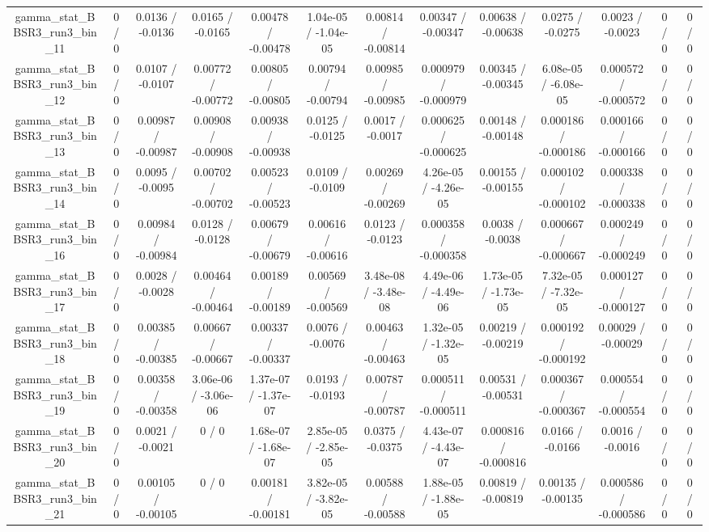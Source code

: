 \documentclass[10pt]{article}
\begin{document}
\begin{table}[htbp]
\begin{center}
\begin{tabular}{|c|c|c|c|c|c|c|c|c|c|c|c|c|}
  gamma_stat_BBSR3_run3_bin_11 & 0 / 0 & 0.0136 / -0.0136 & 0.0165 / -0.0165 & 0.00478 / -0.00478 & 1.04e-05 / -1.04e-05 & 0.00814 / -0.00814 & 0.00347 / -0.00347 & 0.00638 / -0.00638 & 0.0275 / -0.0275 & 0.0023 / -0.0023 & 0 / 0 & 0 / 0 \\ 
  gamma_stat_BBSR3_run3_bin_12 & 0 / 0 & 0.0107 / -0.0107 & 0.00772 / -0.00772 & 0.00805 / -0.00805 & 0.00794 / -0.00794 & 0.00985 / -0.00985 & 0.000979 / -0.000979 & 0.00345 / -0.00345 & 6.08e-05 / -6.08e-05 & 0.000572 / -0.000572 & 0 / 0 & 0 / 0 \\ 
  gamma_stat_BBSR3_run3_bin_13 & 0 / 0 & 0.00987 / -0.00987 & 0.00908 / -0.00908 & 0.00938 / -0.00938 & 0.0125 / -0.0125 & 0.0017 / -0.0017 & 0.000625 / -0.000625 & 0.00148 / -0.00148 & 0.000186 / -0.000186 & 0.000166 / -0.000166 & 0 / 0 & 0 / 0 \\ 
  gamma_stat_BBSR3_run3_bin_14 & 0 / 0 & 0.0095 / -0.0095 & 0.00702 / -0.00702 & 0.00523 / -0.00523 & 0.0109 / -0.0109 & 0.00269 / -0.00269 & 4.26e-05 / -4.26e-05 & 0.00155 / -0.00155 & 0.000102 / -0.000102 & 0.000338 / -0.000338 & 0 / 0 & 0 / 0 \\ 
  gamma_stat_BBSR3_run3_bin_16 & 0 / 0 & 0.00984 / -0.00984 & 0.0128 / -0.0128 & 0.00679 / -0.00679 & 0.00616 / -0.00616 & 0.0123 / -0.0123 & 0.000358 / -0.000358 & 0.0038 / -0.0038 & 0.000667 / -0.000667 & 0.000249 / -0.000249 & 0 / 0 & 0 / 0 \\ 
  gamma_stat_BBSR3_run3_bin_17 & 0 / 0 & 0.0028 / -0.0028 & 0.00464 / -0.00464 & 0.00189 / -0.00189 & 0.00569 / -0.00569 & 3.48e-08 / -3.48e-08 & 4.49e-06 / -4.49e-06 & 1.73e-05 / -1.73e-05 & 7.32e-05 / -7.32e-05 & 0.000127 / -0.000127 & 0 / 0 & 0 / 0 \\ 
  gamma_stat_BBSR3_run3_bin_18 & 0 / 0 & 0.00385 / -0.00385 & 0.00667 / -0.00667 & 0.00337 / -0.00337 & 0.0076 / -0.0076 & 0.00463 / -0.00463 & 1.32e-05 / -1.32e-05 & 0.00219 / -0.00219 & 0.000192 / -0.000192 & 0.00029 / -0.00029 & 0 / 0 & 0 / 0 \\ 
  gamma_stat_BBSR3_run3_bin_19 & 0 / 0 & 0.00358 / -0.00358 & 3.06e-06 / -3.06e-06 & 1.37e-07 / -1.37e-07 & 0.0193 / -0.0193 & 0.00787 / -0.00787 & 0.000511 / -0.000511 & 0.00531 / -0.00531 & 0.000367 / -0.000367 & 0.000554 / -0.000554 & 0 / 0 & 0 / 0 \\ 
  gamma_stat_BBSR3_run3_bin_20 & 0 / 0 & 0.0021 / -0.0021 & 0 / 0 & 1.68e-07 / -1.68e-07 & 2.85e-05 / -2.85e-05 & 0.0375 / -0.0375 & 4.43e-07 / -4.43e-07 & 0.000816 / -0.000816 & 0.0166 / -0.0166 & 0.0016 / -0.0016 & 0 / 0 & 0 / 0 \\ 
  gamma_stat_BBSR3_run3_bin_21 & 0 / 0 & 0.00105 / -0.00105 & 0 / 0 & 0.00181 / -0.00181 & 3.82e-05 / -3.82e-05 & 0.00588 / -0.00588 & 1.88e-05 / -1.88e-05 & 0.00819 / -0.00819 & 0.00135 / -0.00135 & 0.000586 / -0.000586 & 0 / 0 & 0 / 0 \\ 

\end{tabular}
\end{center}
\end{table}
\end{document}
